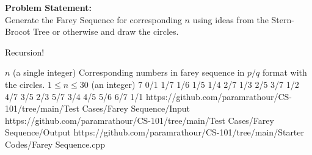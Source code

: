 \textbf{Problem Statement:}\\
Generate the Farey Sequence for corresponding $n$ using ideas from the Stern-Brocot Tree or otherwise and draw the circles.
\begin{hint}
	Recursion!
\end{hint}
\begin{testcasesMore}
	{$n$ \hfill(a single integer)}
	{Corresponding numbers in farey sequence in $p/q$ format with the circles.}
	{$1\leq n\leq 30$ \hfill(an integer)}
	{7}
	{0/1 1/7 1/6 1/5 1/4 2/7 1/3 2/5 3/7 1/2 4/7 3/5 2/3 5/7 3/4 4/5 5/6 6/7 1/1}
	{https://github.com/paramrathour/CS-101/tree/main/Test Cases/Farey Sequence/Input}
	{https://github.com/paramrathour/CS-101/tree/main/Test Cases/Farey Sequence/Output}
	{https://github.com/paramrathour/CS-101/tree/main/Starter Codes/Farey Sequence.cpp}
\end{testcasesMore}
